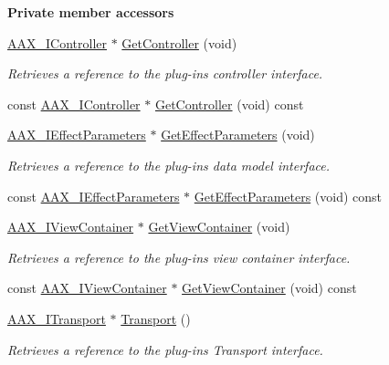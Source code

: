 \begin{Indent}{\bf Private member accessors}\par
\begin{DoxyCompactItemize}
\item 
\hyperlink{a00090}{A\+A\+X\+\_\+\+I\+Controller} $\ast$ \hyperlink{a00017_aad788f844583cd929a1eef02f50e29dc}{Get\+Controller} (void)
\begin{DoxyCompactList}\small\item\em Retrieves a reference to the plug-\/in\textquotesingle{}s controller interface. \end{DoxyCompactList}\item 
const \hyperlink{a00090}{A\+A\+X\+\_\+\+I\+Controller} $\ast$ \hyperlink{a00017_ac16e26795675829d6558a6eb0666370c}{Get\+Controller} (void) const 
\item 
\hyperlink{a00099}{A\+A\+X\+\_\+\+I\+Effect\+Parameters} $\ast$ \hyperlink{a00017_a4036630ef94feeec9f0988086a74f992}{Get\+Effect\+Parameters} (void)
\begin{DoxyCompactList}\small\item\em Retrieves a reference to the plug-\/in\textquotesingle{}s data model interface. \end{DoxyCompactList}\item 
const \hyperlink{a00099}{A\+A\+X\+\_\+\+I\+Effect\+Parameters} $\ast$ \hyperlink{a00017_a3012c422568c747b90283c293b45e783}{Get\+Effect\+Parameters} (void) const 
\item 
\hyperlink{a00117}{A\+A\+X\+\_\+\+I\+View\+Container} $\ast$ \hyperlink{a00017_a49730536ab4c17d85ca6a9ca4a67e6d3}{Get\+View\+Container} (void)
\begin{DoxyCompactList}\small\item\em Retrieves a reference to the plug-\/in\textquotesingle{}s view container interface. \end{DoxyCompactList}\item 
const \hyperlink{a00117}{A\+A\+X\+\_\+\+I\+View\+Container} $\ast$ \hyperlink{a00017_a93709e7671ea9a572047e0d1a5e1f12d}{Get\+View\+Container} (void) const 
\item 
\hyperlink{a00116}{A\+A\+X\+\_\+\+I\+Transport} $\ast$ \hyperlink{a00017_a5a034e713b03fb4591e45c2e7167189d}{Transport} ()
\begin{DoxyCompactList}\small\item\em Retrieves a reference to the plug-\/in\textquotesingle{}s Transport interface. \end{DoxyCompactList}\item 

\end{DoxyCompactItemize}
\end{Indent}
